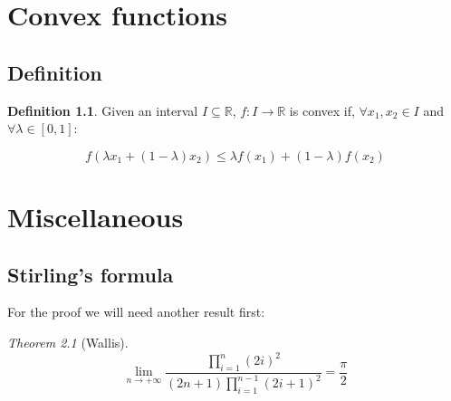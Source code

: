 \documentclass[12pt,a4paper]{report}
\numberwithin{equation}{section}
\theoremstyle{definition}
\newtheorem{definition}{Definition}[section]
\theoremstyle{remark}
\newtheorem{theorem}{Theorem}[section]
\begin{document}
\chapter{Convex functions}

\section{Definition}

\begin{definition}
Given an interval $I \subseteq \mathbb{R}$, $f: I\rightarrow \mathbb{R}$ is convex if, $\forall x_1, x_2 \in I$ and $\forall \lambda \in [0, 1]$:

\begin{equation}
f(\lambda x_1 + (1-\lambda) x_2) \leq \lambda f(x_1) + (1-\lambda)f(x_2)
\end{equation}
\end{definition}

\chapter{Miscellaneous}

\section{Stirling's formula}

For the proof we will need another result first:

\begin{theorem}[Wallis]
\begin{equation}
\lim_{n\rightarrow +\infty} \frac{\displaystyle\prod_{i=1}^{n} (2i)^2}{(2n+1)\displaystyle \prod _{i=1}^{n-1} (2i+1)^2}  = \frac{\pi}{2}
\end{equation}
\end{theorem}
\end{document}

